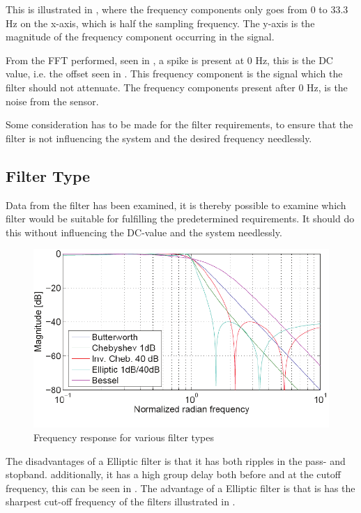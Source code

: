 This is illustrated in , where the frequency components only goes from 0 to 33.3 Hz on the x-axis, which is half the sampling frequency. The y-axis is the magnitude of the frequency component occurring in the signal.

From the FFT performed, seen in , a spike is present at 0 \si{Hz}, this is the DC value, i.e. the offset seen in . This frequency component is the signal which the filter should not attenuate. The frequency components present after 0 Hz, is the noise from the sensor. 

Some consideration has to be made for the filter requirements, to ensure that the filter is not influencing the system and the desired frequency needlessly.

\subsection{Filter Type}
Data from the filter has been examined, it is thereby possible to examine which filter would be suitable for fulfilling the predetermined requirements. It should do this without influencing the DC-value and the system needlessly.

\begin{figure}[H]
	\centering
	\includegraphics[scale=1]{figures/Filtertypes1.pdf}
	\caption{Frequency response for various filter types}
	\label{fig:Filtertype1}
\end{figure}

The disadvantages of a Elliptic filter is that it has both ripples in the pass- and stopband. additionally, it has a high group delay both before and at the cutoff frequency, this can be seen in . The advantage of a Elliptic filter is that is has the sharpest cut-off frequency of the filters illustrated in .

